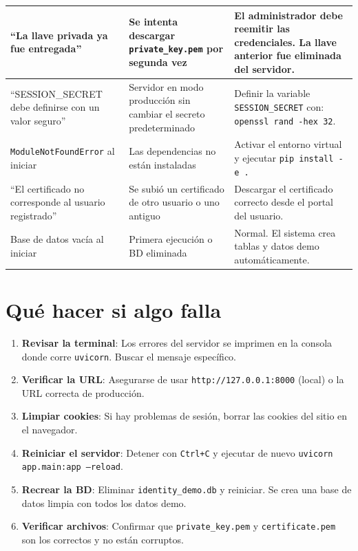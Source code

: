 \documentclass[10pt,letterpaper]{report}
\begin{document}
\begin{longtable}{p{4.2cm} p{4cm} p{5.8cm}}
  ``La llave privada ya fue entregada'' &
  Se intenta descargar \texttt{private\_key.pem} por segunda vez &
  El administrador debe reemitir las credenciales. La llave anterior fue eliminada del servidor. \\
  \midrule

  ``SESSION\_SECRET debe definirse con un valor seguro'' &
  Servidor en modo producción sin cambiar el secreto predeterminado &
  Definir la variable \texttt{SESSION\_SECRET} con: \texttt{openssl rand -hex 32}. \\
  \midrule

  \texttt{ModuleNotFoundError} al iniciar &
  Las dependencias no están instaladas &
  Activar el entorno virtual y ejecutar \texttt{pip install -e .} \\
  \midrule

  ``El certificado no corresponde al usuario registrado'' &
  Se subió un certificado de otro usuario o uno antiguo &
  Descargar el certificado correcto desde el portal del usuario. \\
  \midrule

  Base de datos vacía al iniciar &
  Primera ejecución o BD eliminada &
  Normal. El sistema crea tablas y datos demo automáticamente. \\

\end{longtable}

\section{Qué hacer si algo falla}

\begin{enumerate}[leftmargin=2cm]
  \item \textbf{Revisar la terminal}: Los errores del servidor se imprimen en la consola donde corre \texttt{uvicorn}. Buscar el mensaje específico.
  \item \textbf{Verificar la URL}: Asegurarse de usar \texttt{http://127.0.0.1:8000} (local) o la URL correcta de producción.
  \item \textbf{Limpiar cookies}: Si hay problemas de sesión, borrar las cookies del sitio en el navegador.
  \item \textbf{Reiniciar el servidor}: Detener con \texttt{Ctrl+C} y ejecutar de nuevo \texttt{uvicorn app.main:app --reload}.
  \item \textbf{Recrear la BD}: Eliminar \texttt{identity\_demo.db} y reiniciar. Se crea una base de datos limpia con todos los datos demo.
  \item \textbf{Verificar archivos}: Confirmar que \texttt{private\_key.pem} y \texttt{certificate.pem} son los correctos y no están corruptos.
\end{enumerate}
\end{document}
